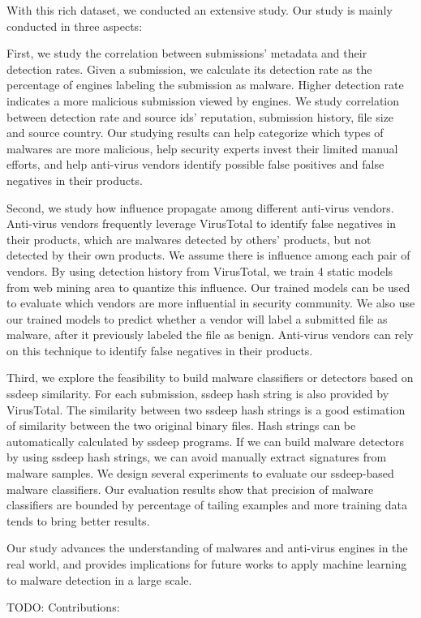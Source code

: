 With this rich dataset, we conducted an extensive study.
Our study is mainly conducted in three aspects: 

First, we study the correlation between submissions’ metadata and their detection rates. 
Given a submission, 
we calculate its detection rate as the percentage of engines 
labeling the submission as malware. 
Higher detection rate indicates a more malicious submission viewed by engines.  
We study correlation between detection rate 
and source ids’ reputation, submission history, file size and source country. 
Our studying results can help categorize which types of malwares are more malicious, 
help security experts invest their limited manual efforts, 
and help anti-virus vendors identify possible false positives and false negatives in their products.   


Second, we study how influence propagate among different anti-virus vendors. 
Anti-virus vendors frequently leverage VirusTotal to identify false negatives in their products, 
which are malwares detected by others’ products, 
but not detected by their own products. 
We assume there is influence among each pair of vendors. 
By using detection history from VirusTotal, 
we train 4 static models from web mining area to quantize this influence. 
Our trained models can be used to evaluate which vendors are more influential in security community. 
We also use our trained models to predict whether a vendor will label a submitted file as malware, 
after it previously labeled the file as benign. 
Anti-virus vendors can rely on this technique to identify false negatives in their products. 

Third, we explore the feasibility to build malware classifiers or detectors based on ssdeep similarity. 
For each submission, ssdeep hash string is also provided by VirusTotal. 
The similarity between two ssdeep hash strings 
is a good estimation of similarity between the two original binary files.
Hash strings can be automatically calculated by ssdeep programs. 
If we can build malware detectors by using ssdeep hash strings, 
we can avoid manually extract signatures from malware samples.   
We design several experiments to evaluate our ssdeep-based malware classifiers. 
Our evaluation results show that precision of malware classifiers are 
bounded by percentage of tailing examples and more training data tends to bring better results.

Our study advances the understanding of malwares and anti-virus engines in the real world, 
and provides implications for future works to 
apply machine learning to malware detection in a large scale. 

{\color{red} TODO: Contributions:}
